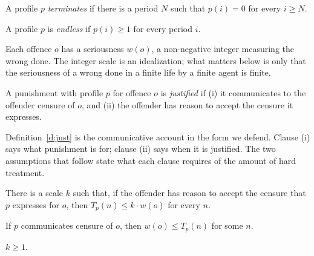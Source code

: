 \documentclass{situationist-preprint}
\begin{document}
\begin{definition}[Termination]\label{d:term}
A profile $p$ \emph{terminates} if there is a period $N$ such that $p(i)=0$ for every $i\ge N$.
\end{definition}

\begin{definition}\label{d:endless}
A profile $p$ is \emph{endless} if $p(i)\ge 1$ for every period $i$.
\end{definition}

Each offence $o$ has a seriousness $w(o)$, a non-negative integer measuring the wrong done. The integer scale is an idealization; what matters below is only that the seriousness of a wrong done in a finite life by a finite agent is finite.

\begin{definition}\label{d:just}
A punishment with profile $p$ for offence $o$ is \emph{justified} if (i) it communicates to the offender censure of $o$, and (ii) the offender has reason to accept the censure it expresses.
\end{definition}

Definition~\ref{d:just} is the communicative account in the form we defend. Clause (i) says what punishment is for; clause (ii) says when it is justified. The two assumptions that follow state what each clause requires of the amount of hard treatment.

\begin{assumption}[Accuracy]\label{a:acc}
There is a scale $k$ such that, if the offender has reason to accept the censure that $p$ expresses for $o$, then $T_p(n)\le k\cdot w(o)$ for every $n$.
\end{assumption}

\begin{assumption}[Seriousness]\label{a:ser}
If $p$ communicates censure of $o$, then $w(o)\le T_p(n)$ for some $n$.
\end{assumption}

\begin{assumption}[Scale]\label{a:scale}
$k\ge 1$.
\end{assumption}
\end{document}
